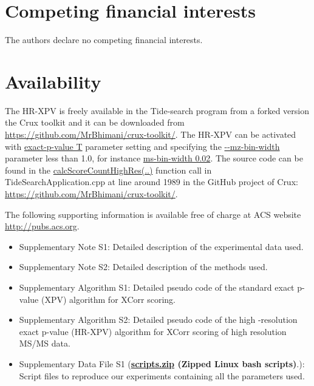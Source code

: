 \documentclass[journal=jpr,manuscript=article]{achemso}
\begin{document}
\section*{Competing financial interests}
The authors declare no competing financial interests.


\section*{Availability}
The HR-XPV is freely available in the Tide-search program from a forked version the Crux toolkit and it can be downloaded from \url{https://github.com/MrBhimani/crux-toolkit/}. The HR-XPV can be activated with \url{exact-p-value T} parameter setting and specifying the \url{--mz-bin-width} parameter less than 1.0, for instance \url{ms-bin-width 0.02}. The source code can be found in the \url{calcScoreCountHighRes(..)} function call in TideSearchApplication.cpp at line around 1989 in the GitHub project of Crux: \url{https://github.com/MrBhimani/crux-toolkit/}.


\begin{suppinfo}
	The following supporting information is available free of charge at ACS website \url{http://pubs.acs.org}.
	\begin{itemize}		
		\itemsep0cm 	
		\item Supplementary Note S1: Detailed description of the experimental data used. 
		\item Supplementary Note S2: Detailed description of the methods used.
		\item Supplementary Algorithm S1: Detailed pseudo code of the standard exact p-value (XPV) algorithm for XCorr scoring.
		\item Supplementary Algorithm S2: Detailed pseudo code of the high -resolution exact p-value (HR-XPV) algorithm for XCorr scoring of high resolution MS/MS data.
		\item Supplementary Data File S1 ({\bf \url{scripts.zip} (Zipped Linux bash scripts)}.): Script files to reproduce our experiments containing all the parameters used.
	\end{itemize}	
\end{suppinfo}


\end{document}
